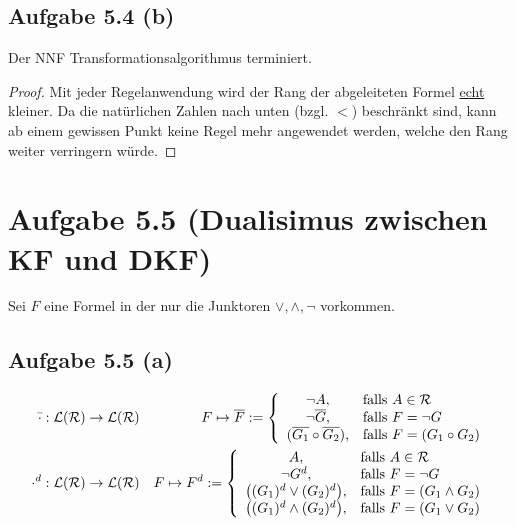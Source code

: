 \documentclass[12pt,a4paper]{article}
\newcommand{\RR}{\mathcal{R}}
\renewcommand{\L}{\mathcal{L}}
\begin{document}
\subsection*{Aufgabe 5.4 (b)}
Der NNF Transformationsalgorithmus terminiert.
\begin{proof}
Mit jeder Regelanwendung wird der Rang der abgeleiteten Formel \underline{echt} kleiner. Da die natürlichen Zahlen nach unten (bzgl. $<$) beschränkt sind, kann ab einem gewissen Punkt keine Regel mehr angewendet werden, welche den Rang weiter verringern würde.
\end{proof}

\section*{Aufgabe 5.5 (Dualisimus zwischen KF und DKF)}
Sei $F$ eine Formel in der nur die Junktoren $\vee,\wedge,\neg$ vorkommen.

\subsection*{Aufgabe 5.5 (a)}
\begin{align*}
\bar{\cdot}&:\L(\RR)\to\L(\RR) &F\mapsto\overline{F}:=\left\lbrace\begin{array}{cl}
\neg A, &\falls A\in\RR\\
\neg\overline{G}, &\falls F=\neg G\\
(\overline{G_1}\circ\overline{G_2}), &\falls F=(G_1\circ G_2)
\end{array}\right.\\
\cdot^d&:\L(\RR)\to\L(\RR) &F\mapsto F^d:=\left\lbrace\begin{array}{cl}
A, &\falls A\in\RR\\
\neg G^d, &\falls F=\neg G\\
\big((G_1)^d\vee(G_2)^d\big), &\falls F=(G_1\wedge G_2)\\
\big((G_1)^d\wedge(G_2)^d\big), &\falls F=(G_1\vee G_2)
\end{array}\right.\\
\end{align*}
\end{document}
